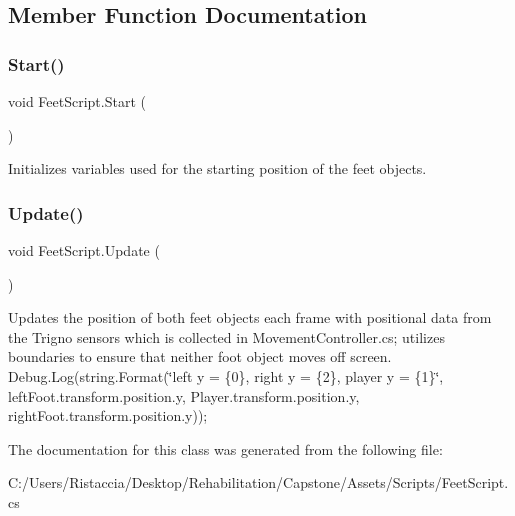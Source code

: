 \subsection{Member Function Documentation}
\mbox{\label{class_feet_script_a0c90eae003cb2d13993b7e90ca9f968c}} 
\subsubsection{\texorpdfstring{Start()}{Start()}}
{\footnotesize\ttfamily void Feet\+Script.\+Start (\begin{DoxyParamCaption}{ }\end{DoxyParamCaption})\hspace{0.3cm}{\ttfamily [private]}}

Initializes variables used for the starting position of the feet objects. \mbox{\label{class_feet_script_acd0106a8d0223acafa6a30b985d753a0}} 
\subsubsection{\texorpdfstring{Update()}{Update()}}
{\footnotesize\ttfamily void Feet\+Script.\+Update (\begin{DoxyParamCaption}{ }\end{DoxyParamCaption})\hspace{0.3cm}{\ttfamily [private]}}

Updates the position of both feet objects each frame with positional data from the Trigno sensors which is collected in Movement\+Controller.\+cs; utilizes boundaries to ensure that neither foot object moves off screen. Debug.\+Log(string.\+Format(\char`\"{}left y = \{0\}, right y = \{2\}, player y = \{1\}\char`\"{}, left\+Foot.\+transform.\+position.\+y, Player.\+transform.\+position.\+y, right\+Foot.\+transform.\+position.\+y)); 

The documentation for this class was generated from the following file\+:\begin{DoxyCompactItemize}
\item 
C\+:/\+Users/\+Ristaccia/\+Desktop/\+Rehabilitation/\+Capstone/\+Assets/\+Scripts/Feet\+Script.\+cs\end{DoxyCompactItemize}
